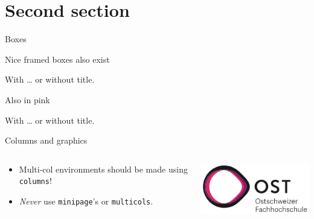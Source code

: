 \documentclass[aspectratio=169]{beamer}    %
\begin{document}
    \section{Second section}
    \begin{frame}{Boxes}
        \begin{PurpleBox}{}
            Nice framed boxes also exist
        \end{PurpleBox}
        \begin{PurpleBox}{With \dots}
            or without title.
        \end{PurpleBox}
        \begin{PinkBox}{}
            Also in pink
        \end{PinkBox}
        \begin{PinkBox}{With \dots}
            or without title.
        \end{PinkBox}
    \end{frame}
    \begin{frame}{Columns and graphics}
        \begin{columns}[onlytextwidth]
            \begin{column}{0.5\textwidth}
                \begin{itemize}
                    \item Multi-col environments should be made using \texttt{columns}!
                    \item \emph{Never} use \texttt{minipage}'s or \texttt{multicols}.
                \end{itemize}
            \end{column}
            \begin{column}{0.5\textwidth}
                \centering
                \includegraphics[width=0.8\linewidth]{header/OSTLogo.png}
            \end{column}
        \end{columns}
    \end{frame}
\end{document}
